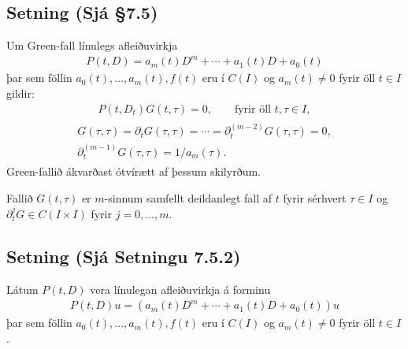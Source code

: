 \documentclass[a4paper,10pt,icelandic]{sphinxmanual}
\begin{document}
\subsection{Setning (Sjá \S{}7.5)}
\label{\detokenize{Kafli07:setning-sja-7-5}}
Um Green-fall línulegs afleiðuvirkja
\begin{equation*}
\begin{split}P(t,D)=a_m(t)D^m+\cdots+a_1(t)D+a_0(t)\end{split}
\end{equation*}
þar sem föllin \(a_0(t),\dots,a_m(t),f(t)\) eru í \(C(I)\) og \(a_m(t)\neq 0\) fyrir öll \(t\in I\) gildir:
\begin{equation*}
\begin{split}P(t,D_t)G(t,\tau)=0,  \qquad \mbox{fyrir öll }t,\tau\in I,\label{2.5.2}\end{split}
\end{equation*}\begin{equation*}
\begin{split}\begin{gathered}
G(\tau,\tau)=\partial_tG(\tau,\tau)=\cdots=
\partial_t^{(m-2)}G(\tau,\tau)=0,\\
\partial_t^{(m-1)}G(\tau,\tau)=1/a_m({\tau})\label{2.5.3}.
\end{gathered}\end{split}
\end{equation*}
Green-fallið ákvarðast ótvírætt af þessum skilyrðum.

Fallið \(G(t,\tau)\) er \(m\)-sinnum samfellt deildanlegt fall af \(t\) fyrir sérhvert \(\tau\in I\) og \(\partial_t^jG\in C(I\times I)\) fyrir \(j=0,\dots,m\).


\subsection{Setning (Sjá Setningu 7.5.2)}
\label{\detokenize{Kafli07:setning-sja-setningu-7-5-2}}
Látum \(P(t,D)\) vera línulegan afleiðuvirkja á forminu
\begin{equation*}
\begin{split}P(t,D)u=(a_m(t)D^m+\cdots+a_1(t)D+a_0(t))u\end{split}
\end{equation*}
þar sem föllin \(a_0(t),\dots,a_m(t),f(t)\) eru í \(C(I)\) og \(a_m(t)\neq 0\) fyrir öll \(t\in I\).
\end{document}
